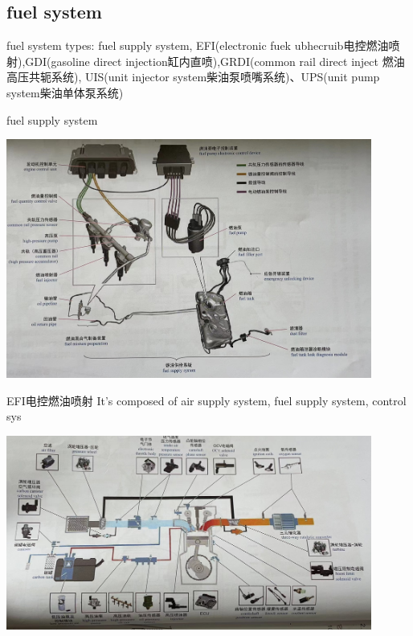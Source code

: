 \subsection{fuel system}
\begin{frame}{fuel system}
	types: fuel supply system, EFI(electronic fuek ubhecruib电控燃油喷射),GDI(gasoline direct injection缸内直喷),GRDI(common rail direct inject 燃油高压共轭系统), UIS(unit injector system柴油泵喷嘴系统)、UPS(unit pump system柴油单体泵系统)
\end{frame}
\begin{frame}
	\begin{block}{fuel supply system}
		\begin{center}
			\includegraphics[width=0.9\textwidth]{2-21}
		\end{center}
	\end{block}
\end{frame}
\begin{frame}
	\begin{block}{EFI电控燃油喷射}
		It's composed of air supply system, fuel supply system, control sys
		\begin{center}
			\includegraphics[width=0.9\textwidth]{2-22}
		\end{center}
	\end{block}
\end{frame}
